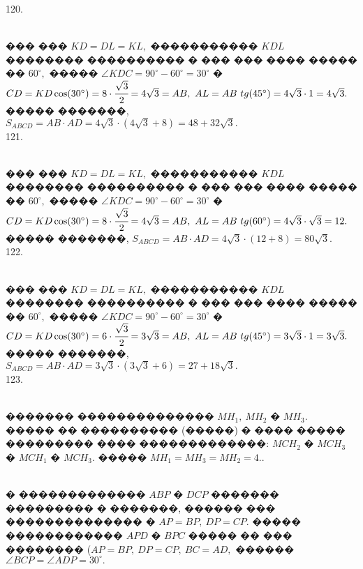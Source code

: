 \documentclass[12pt]{article}
\begin{document}
120. \begin{figure}[ht!]
\end{figure}\\
��� ��� $KD=DL=KL,$ ����������� $KDL$ �������� ���������� � ��� ��� ���� ����� �� $60^\circ,$ ����� $\angle KDC=90^\circ-60^\circ=30^\circ$ � $CD=KD\cos(30^\circ)=8\cdot\cfrac{\sqrt{3}}{2}=4\sqrt{3}=AB,\ AL=AB\ tg(45^\circ)=4\sqrt{3}\cdot1=4\sqrt{3}.$ ����� �������, $S_{ABCD}=AB\cdot AD=4\sqrt{3}\cdot(4\sqrt{3}+8)=48+32\sqrt{3}.$\\
121.\begin{figure}[ht!]
\end{figure}\\
��� ��� $KD=DL=KL,$ ����������� $KDL$ �������� ���������� � ��� ��� ���� ����� �� $60^\circ,$ ����� $\angle KDC=90^\circ-60^\circ=30^\circ$ � $CD=KD\cos(30^\circ)=8\cdot\cfrac{\sqrt{3}}{2}=4\sqrt{3}=AB,\ AL=AB\ tg(60^\circ)=4\sqrt{3}\cdot\sqrt{3}=12.$ ����� �������, $S_{ABCD}=AB\cdot AD=4\sqrt{3}\cdot(12+8)=80\sqrt{3}.$\\
122. \begin{figure}[ht!]
\end{figure}\\
��� ��� $KD=DL=KL,$ ����������� $KDL$ �������� ���������� � ��� ��� ���� ����� �� $60^\circ,$ ����� $\angle KDC=90^\circ-60^\circ=30^\circ$ � $CD=KD\cos(30^\circ)=6\cdot\cfrac{\sqrt{3}}{2}=3\sqrt{3}=AB,\ AL=AB\ tg(45^\circ)=3\sqrt{3}\cdot1=3\sqrt{3}.$ ����� �������, $S_{ABCD}=AB\cdot AD=3\sqrt{3}\cdot(3\sqrt{3}+6)=27+18\sqrt{3}.$\\
123. \begin{figure}[ht!]
\end{figure}\\
������� �������������� $MH_1,\ MH_2$ � $MH_3.$ ����� �� ���������� (�����) � ���� ����� ��������� ���� �������������: $MCH_2$ � $MCH_3$ � $MCH_1$ � $MCH_3.$ ����� $MH_1=MH_3=MH_2=4.$\newpage{}. \begin{figure}[ht!]
\end{figure}\\
� ������������� $ABP$ � $DCP$ ������� ��������� � �������, ������ ��� �������������� � $AP=BP,\ DP=CP.$ ����� ������������ $APD$ � $BPC$ ����� �� ��� �������� ($AP=BP,\ DP=CP,\ BC=AD,$ ������ $\angle BCP=\angle ADP=30^\circ.$\\
\end{document}
